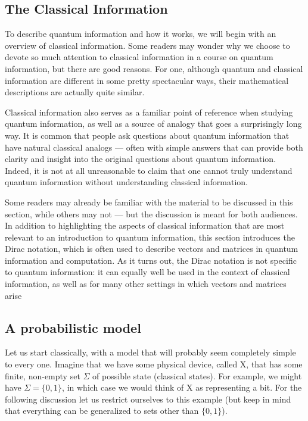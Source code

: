 \subsection{The Classical Information}
To describe quantum information and how it works, we will begin with an overview of classical information. Some readers may wonder why we choose to devote so much attention to classical information in a course on quantum information, but there are good reasons. For one, although quantum and classical information are different in some pretty spectacular ways, their mathematical descriptions are actually quite similar.

Classical information also serves as a familiar point of reference when studying quantum information, as well as a source of analogy that goes a surprisingly long way. It is common that people ask questions about quantum information that have natural classical analogs — often with simple answers that can provide both clarity and insight into the original questions about quantum information. Indeed, it is not at all unreasonable to claim that one cannot truly understand quantum information without understanding classical information.

Some readers may already be familiar with the material to be discussed in this section, while others may not — but the discussion is meant for both audiences. In addition to highlighting the aspects of classical information that are most relevant to an introduction to quantum information, this section introduces the Dirac notation, which is often used to describe vectors and matrices in quantum information and computation. As it turns out, the Dirac notation is not specific to quantum information: it can equally well be used in the context of classical information, as well as for many other settings in which vectors and matrices arise
\subsection{A probabilistic model}
Let us start classically, with a model that will probably seem completely simple to every one. Imagine that we have some physical device, called X, that has some finite, non-empty set $\Sigma$ of possible state (classical states). For example, we might have $\Sigma = \{0,1\}$, in which case we would think of X as representing a bit. For the following discussion let us restrict ourselves to this example (but keep in mind that everything can be generalized to sets other than $\{0,1\}$).

